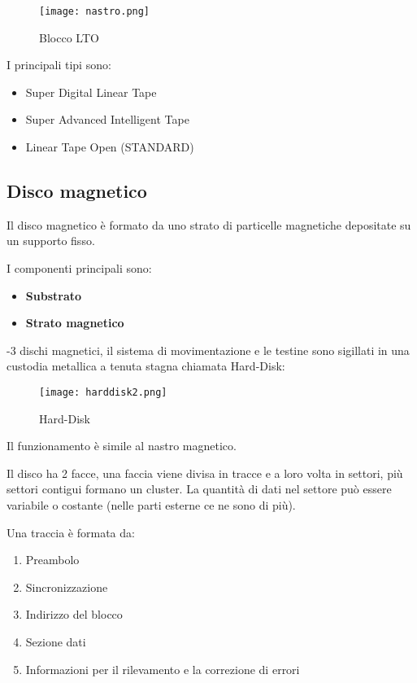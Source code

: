 \documentclass{article}
\begin{document}
\begin{figure}[ht]
    \centering
    \texttt{[image: nastro.png]}
    \caption{Blocco LTO}
    \label{fig:blocco}
\end{figure}

\noindent I principali tipi sono:
\begin{itemize}
    \item Super Digital Linear Tape
    \item Super Advanced Intelligent Tape
    \item Linear Tape Open (STANDARD)
\end{itemize}

\newpage

\subsection{Disco magnetico}

Il disco magnetico è formato da uno strato di particelle magnetiche depositate su un supporto fisso.\newline

\noindent I componenti principali sono:
\begin{itemize}
    \item \textbf{Substrato}
    \item \textbf{Strato magnetico}
\end{itemize}

\vspace{5pt}

-3 dischi magnetici, il sistema di movimentazione e le testine sono sigillati in una custodia metallica a tenuta stagna chiamata Hard-Disk:

\begin{figure}[ht]
    \centering
    \texttt{[image: harddisk2.png]}
    \caption{Hard-Disk}
    \label{fig:harddisk2}
\end{figure}

\noindent Il funzionamento è simile al nastro magnetico.\newline

\noindent Il disco ha 2 facce, una faccia viene divisa in tracce e a loro volta in settori, più settori contigui formano un cluster. La quantità di dati nel settore può essere variabile o costante (nelle parti esterne ce ne sono di più).\newline

\noindent Una traccia è formata da:
\begin{enumerate}
    \item Preambolo
    \item Sincronizzazione
    \item Indirizzo del blocco
    \item Sezione dati
    \item Informazioni per il rilevamento e la correzione di errori
\end{enumerate}
\end{document}
